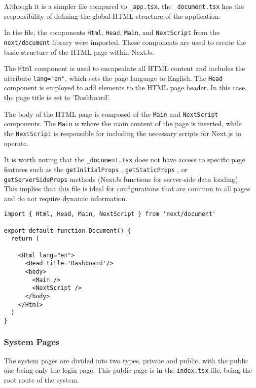 Although it is a simpler file compared to \texttt{\_app.tsx}, the \texttt{\_document.tsx} has the responsibility of defining the global HTML structure of the application.

In the file, the components \texttt{Html}, \texttt{Head}, \texttt{Main}, and \texttt{NextScript} from the \texttt{next/document} library were imported. These components are used to create the basic structure of the HTML page within NextJs.

The \texttt{Html} component is used to encapsulate all HTML content and includes the attribute \texttt{lang="en"}, which sets the page language to English. The \texttt{Head} component \cite{nextjsHeadComponent} is employed to add elements to the HTML page header. In this case, the page title is set to 'Dashboard'.

The body of the HTML page is composed of the \texttt{Main} and \texttt{NextScript} components. The \texttt{Main} is where the main content of the page is inserted, while the \texttt{NextScript} is responsible for including the necessary scripts for Next.js to operate.

It is worth noting that the \texttt{\_document.tsx} does not have access to specific page features such as the \texttt{getInitialProps} \cite{nextjsInitialProps}, \texttt{getStaticProps} \cite{nextjsGetStaticProps}, or \texttt{getServerSideProps} \cite{nextjsGetServerSideProps} methods (NextJs functions for server-side data loading). This implies that this file is ideal for configurations that are common to all pages and do not require dynamic information.

\begin{verbatim}
import { Html, Head, Main, NextScript } from 'next/document'

export default function Document() {
  return (

    <Html lang="en">
      <Head title='Dashboard'/>
      <body>
        <Main />
        <NextScript />
      </body>
    </Html>
  )
}
\end{verbatim}

\subsubsection{System Pages}\label{subsec:systemPages}
The system pages are divided into two types, private and public, with the public one being only the login page. This public page is in the \texttt{index.tsx} file, being the root route of the system.


